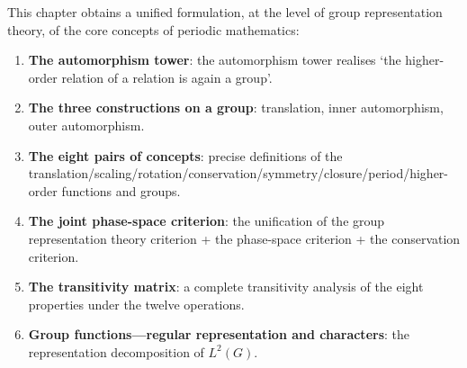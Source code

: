 \begin{remark}\label{rem:group_function_hub}
This chapter obtains a unified formulation, at the level of group representation theory, of the core concepts of periodic mathematics:
\begin{enumerate}[label=(\roman*)]
    \item \textbf{The automorphism tower}: the automorphism tower realises `the higher-order relation of a relation is again a group'.
    \item \textbf{The three constructions on a group}: translation, inner automorphism, outer automorphism.
    \item \textbf{The eight pairs of concepts}: precise definitions of the translation/\allowbreak scaling/\allowbreak rotation/\allowbreak conservation/\allowbreak symmetry/\allowbreak closure/\allowbreak period/\allowbreak higher-order functions and groups.
    \item \textbf{The joint phase-space criterion}: the unification of the group representation theory criterion + the phase-space criterion + the conservation criterion.
    \item \textbf{The transitivity matrix}: a complete transitivity analysis of the eight properties under the twelve operations.
    \item \textbf{Group functions---regular representation and characters}: the representation decomposition of $L^2(G)$.
\end{enumerate}
\end{remark}

